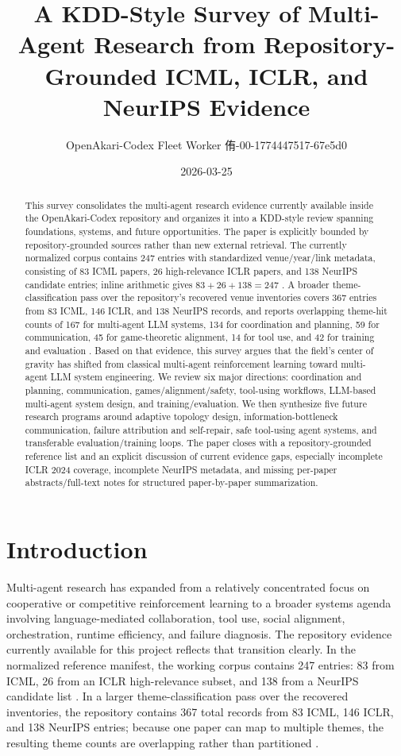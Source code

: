 \documentclass[11pt]{article}
\title{A KDD-Style Survey of Multi-Agent Research from Repository-Grounded ICML, ICLR, and NeurIPS Evidence}
\author{OpenAkari-Codex Fleet Worker 侑-00-1774447517-67e5d0}
\date{2026-03-25}
\begin{document}
\maketitle

\begin{abstract}
This survey consolidates the multi-agent research evidence currently available inside the OpenAkari-Codex repository and organizes it into a KDD-style review spanning foundations, systems, and future opportunities. The paper is explicitly bounded by repository-grounded sources rather than new external retrieval. The currently normalized corpus contains 247 entries with standardized venue/year/link metadata, consisting of 83 ICML papers, 26 high-relevance ICLR papers, and 138 NeurIPS candidate entries; inline arithmetic gives $83 + 26 + 138 = 247$ \cite{manifest}. A broader theme-classification pass over the repository's recovered venue inventories covers 367 entries from 83 ICML, 146 ICLR, and 138 NeurIPS records, and reports overlapping theme-hit counts of 167 for multi-agent LLM systems, 134 for coordination and planning, 59 for communication, 45 for game-theoretic alignment, 14 for tool use, and 42 for training and evaluation \cite{theme_synthesis}. Based on that evidence, this survey argues that the field's center of gravity has shifted from classical multi-agent reinforcement learning toward multi-agent LLM system engineering. We review six major directions: coordination and planning, communication, games/alignment/safety, tool-using workflows, LLM-based multi-agent system design, and training/evaluation. We then synthesize five future research programs around adaptive topology design, information-bottleneck communication, failure attribution and self-repair, safe tool-using agent systems, and transferable evaluation/training loops. The paper closes with a repository-grounded reference list and an explicit discussion of current evidence gaps, especially incomplete ICLR 2024 coverage, incomplete NeurIPS metadata, and missing per-paper abstracts/full-text notes for structured paper-by-paper summarization.
\end{abstract}

\section{Introduction}
Multi-agent research has expanded from a relatively concentrated focus on cooperative or competitive reinforcement learning to a broader systems agenda involving language-mediated collaboration, tool use, social alignment, orchestration, runtime efficiency, and failure diagnosis. The repository evidence currently available for this project reflects that transition clearly. In the normalized reference manifest, the working corpus contains 247 entries: 83 from ICML, 26 from an ICLR high-relevance subset, and 138 from a NeurIPS candidate list \cite{manifest}. In a larger theme-classification pass over the recovered inventories, the repository contains 367 total records from 83 ICML, 146 ICLR, and 138 NeurIPS entries; because one paper can map to multiple themes, the resulting theme counts are overlapping rather than partitioned \cite{theme_synthesis,theme_json}.
\end{document}
